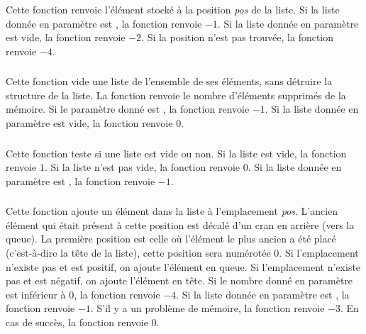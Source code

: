 \noindent Cette fonction renvoie l'élément stocké à la position \textit{pos} de la liste. %
Si la liste donnée en paramètre est , la fonction renvoie $ -1 $. %
Si la liste donnée en paramètre est vide, la fonction renvoie $ -2 $. %
Si la position n'est pas trouvée, la fonction renvoie $ -4 $. %


\subsubsection*{}

\noindent Cette fonction vide une liste de l'ensemble de ses éléments, sans détruire la structure de la liste.
La fonction renvoie le nombre d'éléments supprimés de la mémoire.
Si le paramètre donné est , la fonction renvoie $ -1 $.
Si la liste donnée en paramètre est vide, la fonction renvoie $ 0 $.


\subsubsection*{}

\noindent Cette fonction teste si une liste est vide ou non.
Si la liste est vide, la fonction renvoie $ 1 $.
Si la liste n'est pas vide, la fonction renvoie $ 0 $.
Si la liste donnée en paramètre est , la fonction renvoie $ -1 $.


\subsubsection*{}

\noindent Cette fonction ajoute un élément dans la liste à l'emplacement \textit{pos}.
L'ancien élément qui était présent à cette position est décalé d'un cran en arrière (vers la queue).
La première position est celle où l'élément le plus ancien a été placé (c'est-à-dire la tête de la liste), cette position sera numérotée $ 0 $.
Si l'emplacement n'existe pas et est positif, on ajoute l'élément en queue.
Si l'emplacement n'existe pas et est négatif, on ajoute l'élément en tête.
Si le nombre donné en paramètre est inférieur à $ 0 $, la fonction renvoie $ -4 $.
Si la liste donnée en paramètre est , la fonction renvoie $ -1 $.
S'il y a un problème de mémoire, la fonction renvoie $ -3 $.
En cas de succès, la fonction renvoie $ 0 $.


